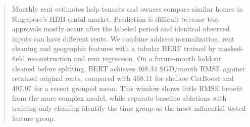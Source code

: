 \begin{abstract}
Monthly rent estimates help tenants and owners compare similar homes in Singapore's HDB rental market.  Prediction is difficult because test approvals mostly occur after the labeled period and identical observed inputs can have different rents.  We combine address normalization, rent cleaning and geographic features with a tabular BERT trained by masked-field reconstruction and rent regression.  On a future-month holdout cleaned before splitting, BERT achieves 468.34 SGD/month RMSE against retained original rents, compared with 468.11 for shallow CatBoost and 497.97 for a recent grouped mean.  This window shows little RMSE benefit from the more complex model, while separate baseline ablations with training-only cleaning identify the time group as the most influential tested feature group.
\end{abstract}
